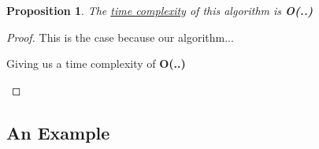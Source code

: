 \documentclass[12pt]{article}
\newtheorem{proposition}[theorem]{Proposition}
\begin{document}
\begin{proposition}
\label{numq}
The \underline{time complexity} of this algorithm is \textbf{O(..)}
\end{proposition}

\begin{proof}
This is the case because our algorithm...
\begin{center}
    Giving us a time complexity of \textbf{O(..)}
\end{center}
\end{proof}


\subsection{An Example}



\end{document}
